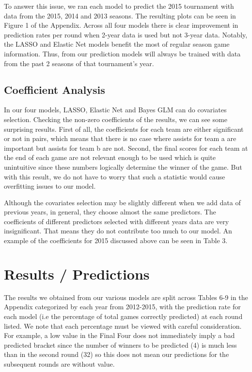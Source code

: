 \documentclass{article} %
\begin{document}
To answer this issue, we ran each model to predict the 2015 tournament with data from the 2015, 2014 and 2013 seasons. The resulting plots can be seen in Figure 1 of the Appendix. Across all four models there is clear improvement in prediction rates per round when 2-year data is used but not 3-year data. Notably, the LASSO and Elastic Net models benefit the most of regular season game information. Thus, from our prediction models will always be trained with data from the past 2 seasons of that tournament's year.

\subsection{Coefficient Analysis}

In our four models, LASSO, Elastic Net and Bayes GLM can do covariates selection. Checking the non-zero coefficients of the results, we can see some surprising results. First of all, the coefficients for each team are either significant or not in pairs, which means that there is no case where assists for team a are important but assists for team b are not. Second, the final scores for each team at the end of each game are not relevant enough to be used which is quite unintuitive since these numbers logically determine the winner of the game. But with this result, we do not have to worry that such a statistic would cause overfitting issues to our model.\

Although the covariates selection may be slightly different when we add data of previous years, in general, they choose almost the same predictors. The coefficients of different predictors selected with different years data are very insignificant. That means they do not contribute too much to our model. An example of the coefficients for 2015 discussed above can be seen in Table 3.

\section{Results / Predictions}

The results we obtained from our various models are split across Tables 6-9 in the Appendix categorized by each year from 2012-2015, with the prediction rate for each model (i.e the percentage of total games correctly predicted) at each round listed. We note that each percentage must be viewed with careful consideration. For example, a low value in the Final Four does not immediately imply a bad predicted bracket since the number of winners to be predicted (4) is much less than in the second round (32) so this does not mean our predictions for the subsequent rounds are without value.
\end{document}
